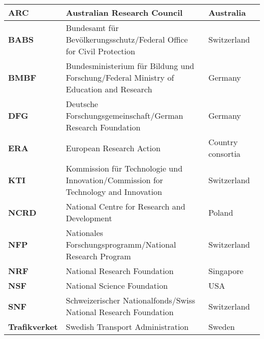 \begin{tabular}[width=0.99\textwidth]{p{0.1\linewidth} p{0.65\linewidth} p{0.25\linewidth}}
\hline
\textbf{ARC} & Australian Research Council  & Australia\\
\hline
\textbf{BABS} & Bundesamt für Bevölkerungsschutz/Federal Office for Civil Protection & Switzerland\\
\hline
\textbf{BMBF} & Bundesministerium für Bildung und Forschung/Federal Ministry of Education and Research & Germany\\
\hline
\textbf{DFG} & Deutsche Forschungsgemeinschaft/German Research Foundation & Germany\\
\hline
\textbf{ERA} & European Research Action & Country consortia\\
\hline
\textbf{KTI} & Kommission für Technologie und Innovation/Commission for Technology and Innovation  & Switzerland\\
\hline
\textbf{NCRD} & National Centre for Research and Development & Poland\\
\hline
\textbf{NFP} & Nationales Forschungsprogramm/National Research Program & Switzerland\\
\hline
\textbf{NRF} & National Research Foundation & Singapore\\
\hline
\textbf{NSF} & National Science Foundation & USA\\
\hline
\textbf{SNF} & Schweizerischer Nationalfonds/Swiss National Research Foundation & Switzerland\\
\hline
\textbf{Trafikverket} & Swedish Transport Administration & Sweden\\
\hline
\end{tabular}

